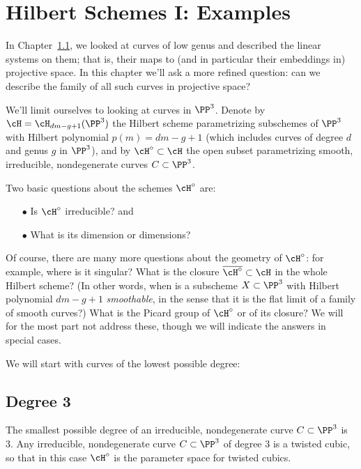 

\chapter{Hilbert Schemes I: Examples}
\label{HilbertSchemesChapter}

In Chapter~\ref{}, we looked at curves of low genus and described the linear systems on them; that is, their maps to (and in particular their embeddings in) projective space. In this chapter we'll ask a more refined question: can we describe the family of all such curves in projective space?

We'll limit ourselves to looking at curves in $\PP^3$. Denote by $\cH = \cH_{dm-g+1}(\PP^3)$ the Hilbert scheme parametrizing subschemes of $\PP^3$ with Hilbert polynomial $p(m) = dm-g+1$ (which includes
curves of degree $d$ and genus $g$ in $\PP^3$), and by $\cH^\circ \subset \cH$ the open subset parametrizing smooth, irreducible, nondegenerate curves $C \subset \PP^3$. 

Two basic questions about the schemes $\cH^\circ$ are:

\begin{enumerate}
\item[$\bullet$] Is $\cH^\circ$ irreducible? and
\item[$\bullet$]  What is its dimension or dimensions?
\end{enumerate}

Of course, there are many more questions about the geometry of $\cH^\circ$: for example,  where is it singular? What is the closure $\overline{\cH^\circ} \subset \cH$ in the whole Hilbert scheme? (In other words, when is a subscheme $X \subset \PP^3$ with Hilbert polynomial $dm-g+1$ \emph{smoothable}, in the sense that it is the flat limit of a family of smooth curves?) What is the Picard group of $\cH^\circ$ or of its closure? We will for the most part not address these, though we will indicate the answers in special cases.

We will start with curves of the lowest possible degree:

\section{Degree 3}

The smallest possible degree of an irreducible, nondegenerate curve $C \subset \PP^3$ is 3. Any irreducible, nondegenerate curve $C \subset \PP^3$ of degree 3 is a twisted cubic, so that in this case $\cH^\circ$ is the parameter space for twisted cubics.

